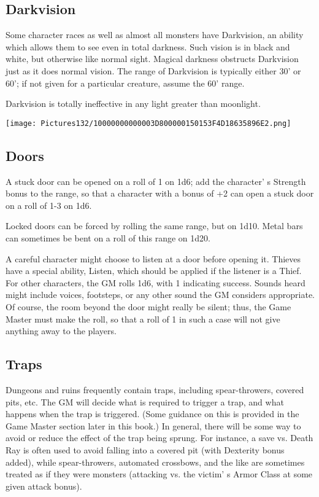 \documentclass[a4paper,twoside,openany,10pt]{book}
\begin{document}
\begin{multicols}{2}
\subsection{Darkvision}\label{darkvision}

Some character races as well as almost all monsters have Darkvision, an ability which allows them to see even in total darkness. Such vision is in black and white, but otherwise like normal sight. Magical darkness obstructs Darkvision just as it does normal vision. The range of Darkvision is typically either 30' or 60'; if not given for a particular creature, assume the 60' range.

Darkvision is totally ineffective in any light greater than moonlight.


\begin{flushleft}
	\texttt{[image: Pictures132/10000000000003D800000150153F4D18635896E2.png]}
\end{flushleft}

\subsection{Doors}\label{doors}

A stuck door can be opened on a roll of 1 on 1d6; add the character' s Strength bonus to the range, so that a character with a bonus of +2 can open a stuck door on a roll of 1-3 on 1d6.

Locked doors can be forced by rolling the same range, but on 1d10. Metal bars can sometimes be bent on a roll of this range on 1d20.

A careful character might choose to listen at a door before opening it. Thieves have a special ability, Listen, which should be applied if the listener is a Thief. For other characters, the GM rolls 1d6, with 1 indicating success. Sounds heard might include voices, footsteps, or any other sound the GM considers appropriate. Of course, the room beyond the door might really be silent; thus, the Game Master must make the roll, so that a roll of 1 in such a case will not give anything away to the players.

\subsection{Traps}\label{traps}

Dungeons and ruins frequently contain traps, including spear-throwers, covered pits, etc. The GM will decide what is required to trigger a trap, and what happens when the trap is triggered. (Some guidance on this is provided in the Game Master section later in this book.) In general, there will be some way to avoid or reduce the effect of the trap being sprung. For instance, a save vs. Death Ray is often used to avoid falling into a covered pit (with Dexterity bonus added), while spear-throwers, automated crossbows, and the like are sometimes treated as if they were monsters (attacking vs. the victim' s Armor Class at some given attack bonus).


\end{multicols}
\end{document}
